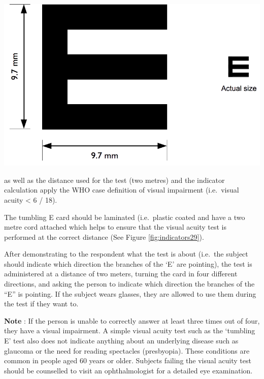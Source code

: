 \documentclass[12pt,a4paper]{book}
\theoremstyle{definition}
\theoremstyle{definition}
\theoremstyle{definition}
\theoremstyle{remark}
\begin{document}
\begin{center}\includegraphics[width=800pt]{figures/indicators28} \end{center}

as well as the distance used for the test (two metres) and the indicator
calculation apply the WHO case definition of visual impairment
(i.e.~visual acuity \textless{} 6 / 18).

The tumbling E card should be laminated (i.e.~plastic coated and have a
two metre cord attached which helps to ensure that the visual acuity
test is performed at the correct distance (See Figure
\ref{fig:indicators29}).

After demonstrating to the respondent what the test is about (i.e.~the
subject should indicate which direction the branches of the `E' are
pointing), the test is administered at a distance of two meters, turning
the card in four different directions, and asking the person to indicate
which direction the branches of the ``E'' is pointing. If the subject
wears glasses, they are allowed to use them during the test if they want
to.

\textbf{Note} : If the person is unable to correctly answer at least
three times out of four, they have a visual impairment. A simple visual
acuity test such as the `tumbling E' test also does not indicate
anything about an underlying disease such as glaucoma or the need for
reading spectacles (presbyopia). These conditions are common in people
aged 60 years or older. Subjects failing the visual acuity test should
be counselled to visit an ophthalmologist for a detailed eye
examination.
\end{document}
